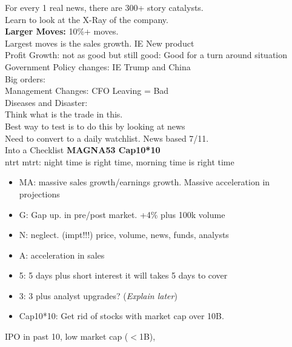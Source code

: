 \documentclass[answers,12pt,addpoints]{exam}
\begin{document}
For every 1 real news, there are 300+ story catalysts.\\
Learn to look at the X-Ray of the company.\\
\textbf{Larger Moves:} 10\%+ moves.\\
Largest moves is the sales growth. IE New product\\
Profit Growth: not as good but still good: Good for a turn around situation\\
Government Policy changes: IE Trump and China\\
Big orders: \\
Management Changes: CFO Leaving = Bad\\
Diseases and Disaster:\\
Think what is the trade in this.\\
Best way to test is to do this by looking at news \\
Need to convert to a daily watchlist. News based 7/11.\\
Into a Checklist \textbf{MAGNA53 Cap10*10}\\
ntrt mtrt: night time is right time, morning time is right time\\
\begin{itemize}
    \item MA: massive sales growth/earnings growth. Massive acceleration in projections
    \item G: Gap up. in pre/post market. +4\% plus 100k volume 
    \item N: neglect. (impt!!!) price, volume, news, funds, analysts 
    \item A: acceleration in sales
    \item 5: 5 days plus short interest it will takes 5 days to cover
    \item 3: 3 plus analyst upgrades? (\textit{Explain later}) 
    \item Cap10*10: Get rid of stocks with market cap over 10B. 
\end{itemize}
IPO in past 10, low market cap ($<$1B),  
\end{document}
